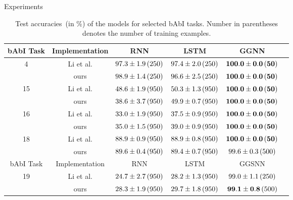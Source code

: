 \documentclass[final,hyperref={pdfpagelabels=false}]{beamer}
\begin{document}
\begin{frame}[t]
\begin{columns}[t]
\begin{column}{.3\textwidth}
\begin{block}{Experiments}
      \begin{table}[t]
          \caption{Test accuracies~(in \%) of the models for selected bAbI tasks. Number in parentheses denotes the number of training examples.}\label{table:table-1}
          \vspace{0.1in}
          \centering
          \small
          \begin{tabular}{cccccc}
              \toprule
              bAbI Task & Implementation & RNN & LSTM & GGNN \\  \midrule
              \multirow{2}{*}{4} & Li et al. & $97.3 \pm 1.9\thinspace (250)$ & $97.4 \pm 2.0\thinspace  (250)$ & $\mathbf{100.0 \pm 0.0\thinspace (50)}$ \\
              & ours & $98.9 \pm 1.4\thinspace (250)$ & $96.6 \pm 2.5\thinspace (250)$ & $\mathbf{100.0 \pm 0.0\thinspace (50)}$ \\  \midrule
        
              \multirow{2}{*}{15} & Li et al. &  $48.6 \pm 1.9\thinspace (950)$ & $50.3 \pm 1.3\thinspace (950)$ & $\mathbf{100.0 \pm 0.0\thinspace (50)}$  \\
              & ours & $38.6 \pm 3.7\thinspace (950)$ & $49.9 \pm 0.7\thinspace (950)$ & $\mathbf{100.0 \pm 0.0\thinspace (50)}$ \\  \midrule
        
              \multirow{2}{*}{16} & Li et al. &  $33.0 \pm 1.9\thinspace (950)$&  $37.5 \pm 0.9\thinspace (950)$ & $\mathbf{100.0 \pm 0.0\thinspace (50)}$  \\
              & ours & $35.0 \pm 1.5\thinspace (950)$ & $39.0 \pm 0.9\thinspace (950)$ & $\mathbf{100.0 \pm 0.0\thinspace (50)}$ \\  \midrule
        
              \multirow{2}{*}{18} & Li et al. & $88.9 \pm 0.9\thinspace (950)$ & $88.9 \pm 0.8\thinspace (950)$ & $\mathbf{100.0 \pm 0.0\thinspace (50)}$ \\
              & ours & $89.6 \pm 0.4\thinspace (950)$ & $89.4 \pm 0.7\thinspace (950)$ & $99.6\pm 0.3\thinspace (500)$\\ \midrule
              
              bAbI Task & Implementation & RNN & LSTM & GGSNN \\  \midrule
              
              \multirow{2}{*}{19} & Li et al. & $24.7 \pm 2.7\thinspace (950)$ & $28.2 \pm 1.3\thinspace (950)$ & $99.0\pm1.1\thinspace (250)$\\ 
              & ours & $28.3 \pm 1.9\thinspace (950)$ & $29.7 \pm 1.8\thinspace (950)$ & $\mathbf{99.1\pm 0.8}\thinspace (500)$\\ \bottomrule
        \end{tabular}
        \end{table}
        \vspace{0.2in}
        

\end{block}
\end{column}
\end{columns}
\end{frame}
\end{document}
